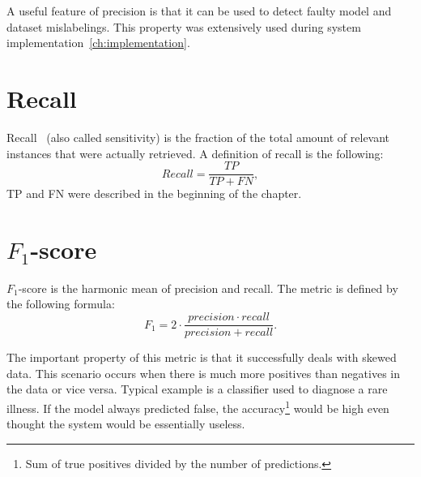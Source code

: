 A useful feature of precision is that it can be used to detect faulty model and dataset mislabelings.
This property was extensively used during system implementation~\ref{ch:implementation}.

\section{Recall}\label{sec:recall}
Recall~\cite{PreRec} (also called sensitivity) is the fraction of the total amount of relevant instances that were
actually retrieved.
A definition of recall is the following:
\begin{equation}
    Recall = \frac{TP}{TP + FN},
\end{equation}
TP and FN were described in the beginning of the chapter.

\section{$F_1$-score}\label{sec:f-score}
$F_1$-score is the harmonic mean of precision and recall.
The metric is defined by the following formula:
\begin{equation}
    F_1 = 2 \cdot \frac{precision \cdot recall}{precision + recall}.
\end{equation}

The important property of this metric is that it successfully deals with skewed data.
This scenario occurs when there is much more positives than negatives in the data or vice versa.
Typical example is a classifier used to diagnose a rare illness.
If the model always predicted false, the accuracy\footnote{Sum of true positives divided by the number of predictions.}
would be high even thought the system would be essentially useless.